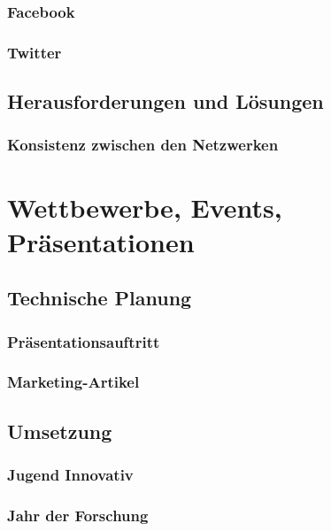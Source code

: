     \subsubsection{Facebook}

    \subsubsection{Twitter}

  \subsection{Herausforderungen und Lösungen}

    \subsubsection{Konsistenz zwischen den Netzwerken}

\section{Wettbewerbe, Events, Präsentationen}

  \subsection{Technische Planung}

    \subsubsection{Präsentationsauftritt}

    \subsubsection{Marketing-Artikel}

  \subsection{Umsetzung}

    \subsubsection{Jugend Innovativ}

    \subsubsection{Jahr der Forschung}

